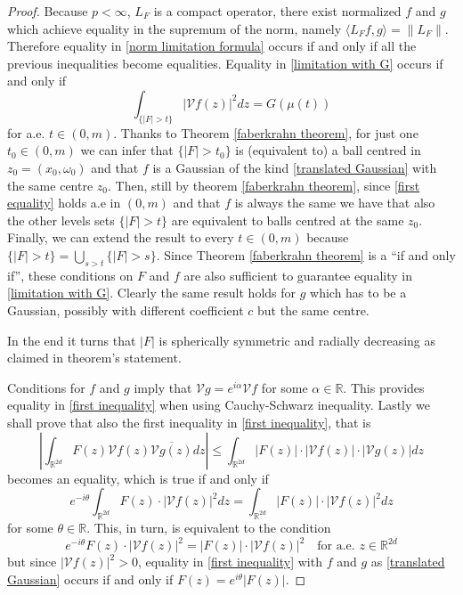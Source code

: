 \documentclass[corpo=11pt, stile=classica, tipotesi=custom,
greek, evenboxes, english]{toptesi}
\numberwithin{equation}{chapter}
\newcommand{\R}{\mathbb{R}} %
\newcommand{\V}{\mathcal{V}} %
\begin{document}
\begin{proof}
	{\color{red} Because $p<\infty$, $L_F$ is a compact operator}, there exist normalized $f$ and $g$ which achieve equality in the supremum of the norm, namely $\langle L_F f, g \rangle = \| L_F \|$. Therefore equality in \eqref{norm limitation formula} occurs if and only if all the previous inequalities become equalities. Equality in \eqref{limitation with G} occurs if and only if
	\begin{equation}\label{first equality}
		\int_{\{|F|>t\}} |\V f(z)|^2 dz = G(\mu(t))
	\end{equation}
	for a.e. $t \in (0,m)$. Thanks to Theorem \ref{faberkrahn theorem}, for just one $t_0 \in (0,m)$ we can infer that $\{|F|>t_0\}$ is (equivalent to) a ball centred in $z_0 = (x_0,\omega_0)$ and that $f$ is a Gaussian of the kind \eqref{translated Gaussian} with the same centre $z_0$. Then, still by theorem \ref{faberkrahn theorem}, since \eqref{first equality} holds a.e in $(0,m)$ and that $f$ is always the same we have that also the other levels sets $\{|F|>t\}$ are equivalent to balls centred at the same $z_0$. Finally, we can extend the result to every $t \in (0,m)$ because $\{|F|>t\} = \bigcup_{s > t} \{|F|>s\}$. Since Theorem \ref{faberkrahn theorem} is a ``if and only if'', these conditions on $F$ and $f$ are also sufficient to guarantee equality in \eqref{limitation with G}. Clearly the same result holds for $g$ which has to be a Gaussian, possibly with different coefficient $c$ but the same centre.
	
	In the end it turns that $|F|$ is spherically symmetric and radially decreasing as claimed in theorem's statement.
	
	Conditions for $f$ and $g$ imply that $\V g  = e^{i \alpha} \V f$ for some $\alpha \in \R$. This provides equality in \eqref{first inequality} when using Cauchy-Schwarz inequality. Lastly we shall prove that also the first inequality in \eqref{first inequality}, that is
	\begin{equation*}
		\left\vert \int_{\R^{2d}} F(z) \V f(z) \overline{\V g(z)} dz \right\vert \leq \int_{\R^{2d}} |F(z)| \cdot | \V f(z)| \cdot |\V g(z)| dz
	\end{equation*}
	becomes an equality, which is true if and only if
	\begin{equation*}
		e^{-i\theta}  \int_{\R^{2d}} F(z) \cdot |\V f(z)|^2 dz = \int_{\R^{2d}} |F(z)| \cdot | \V f(z)|^2 dz
	\end{equation*}
	for some $\theta \in \R$. This, in turn, is equivalent to the condition
	\begin{equation*}
		e^{-i \theta}F(z) \cdot |\V f(z)|^2 = |F(z)| \cdot |\V f(z)|^2 \quad \text{for a.e. } z \in \R^{2d}
	\end{equation*}
	but since $|\V f(z)|^2 > 0$, equality in \ref{first inequality} with $f$ and $g$ as \eqref{translated Gaussian} occurs if and only if $F(z) = e^{i \theta} |F(z)|$.
\end{proof}
\end{document}
